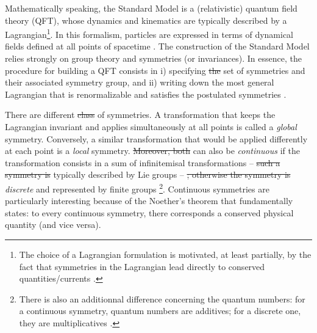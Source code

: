 \documentclass[ALICE,manyauthors]{cernphprep}
\providecommand{\DIFaddtex}[1]{{\protect\color{blue}\uwave{#1}}} %
\providecommand{\DIFdeltex}[1]{{\protect\color{red}\sout{#1}}}                      %
\providecommand{\DIFaddbegin}{} %
\providecommand{\DIFaddend}{} %
\providecommand{\DIFdelbegin}{} %
\providecommand{\DIFdelend}{} %
\providecommand{\DIFadd}[1]{\texorpdfstring{\DIFaddtex{#1}}{#1}} %
\providecommand{\DIFdel}[1]{\texorpdfstring{\DIFdeltex{#1}}{}} %
\newcommand{\DIFscaledelfig}{0.5}
\newlength{\DIFdelgraphicswidth} %
\newlength{\DIFdelgraphicsheight} %
\newcommand{\DIFaddincludegraphics}[2][]{{\color{blue}\fbox{\DIFOincludegraphics[#1]{#2}}}} %
\newcommand{\DIFdelincludegraphics}[2][]{%
\sbox{\DIFdelgraphicsbox}{\DIFOincludegraphics[#1]{#2}}%
\settoboxwidth{\DIFdelgraphicswidth}{\DIFdelgraphicsbox} %
\settoboxtotalheight{\DIFdelgraphicsheight}{\DIFdelgraphicsbox} %
\scalebox{\DIFscaledelfig}{%
\parbox[b]{\DIFdelgraphicswidth}{\usebox{\DIFdelgraphicsbox}\\[-\baselineskip] \rule{\DIFdelgraphicswidth}{0em}}\llap{\resizebox{\DIFdelgraphicswidth}{\DIFdelgraphicsheight}{%
\setlength{\unitlength}{\DIFdelgraphicswidth}%
\begin{picture}(1,1)%
\thicklines\linethickness{2pt} %
{\color[rgb]{1,0,0}\put(0,0){\framebox(1,1){}}}%
{\color[rgb]{1,0,0}\put(0,0){\line( 1,1){1}}}%
{\color[rgb]{1,0,0}\put(0,1){\line(1,-1){1}}}%
\end{picture}%
}\hspace*{3pt}}} %
} %
\DeclareRobustCommand{\DIFaddbegin}{\DIFOaddbegin \let\includegraphics\DIFaddincludegraphics} %
\DeclareRobustCommand{\DIFaddend}{\DIFOaddend \let\includegraphics\DIFOincludegraphics} %
\DeclareRobustCommand{\DIFdelbegin}{\DIFOdelbegin \let\includegraphics\DIFdelincludegraphics} %
\DeclareRobustCommand{\DIFdelend}{\DIFOaddend \let\includegraphics\DIFOincludegraphics} %
\begin{document}
Mathematically speaking, the Standard Model is a (relativistic) quantum field theory (QFT), whose dynamics and kinematics are typically described by a Lagrangian\footnote{The choice of a Lagrangian formulation is motivated, at least partially, by the fact that symmetries in the Lagrangian lead directly to conserved quantities/currents \cite{kochAspectsChiralSymmetry1997}.}. In this formalism, particles are expressed in terms of dynamical fields defined at all points of spacetime \cite{peskinIntroductionQuantumField2018}. The construction of the Standard Model relies strongly on group theory and symmetries (or invariances). In essence, the procedure for building a QFT consists in i) specifying \DIFdelbegin \DIFdel{the }\DIFdelend \DIFaddbegin \DIFadd{a }\DIFaddend set of symmetries and their associated symmetry group, and ii) writing down the most general Lagrangian that is renormalizable and satisfies the postulated symmetries \cite{braibantParticlesFundamentalInteractions2012}.

There are different \DIFdelbegin \DIFdel{class }\DIFdelend \DIFaddbegin \DIFadd{classes }\DIFaddend of symmetries. A transformation that keeps the Lagrangian invariant and applies simultaneously at all points is called a \textit{global} symmetry. Conversely, a similar transformation that would be applied differently at each point is a \textit{local} symmetry. \DIFdelbegin \DIFdel{Moreover, both }\DIFdelend \DIFaddbegin \DIFadd{Both global and local symmetries }\DIFaddend can also be \textit{continuous} if the transformation consists in a sum of infinitemisal transformations -- \DIFdelbegin \DIFdel{such a symmetry is }\DIFdelend typically described by Lie groups -- \DIFdelbegin \DIFdel{; otherwise the symmetry is }\DIFdelend \DIFaddbegin \DIFadd{or }\DIFaddend \textit{discrete} and represented by finite groups \cite{peskinIntroductionQuantumField2018}\footnote{There is also an additionnal difference concerning the quantum numbers: for a continuous symmetry, quantum numbers are additives; for a discrete one, they are multiplicatives \cite{braibantParticlesFundamentalInteractions2012}.}. Continuous symmetries are particularly interesting because of the Noether's theorem \cite{noetherInvariantVariationProblems1971} that fundamentally states: to every continuous symmetry, there corresponds a conserved physical quantity (and vice versa).\\
\end{document}
